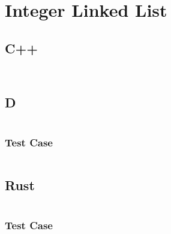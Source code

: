 \documentclass[finalcopy]{srpaper}
\begin{document}
\section{Integer Linked List}
\subsection{C++}
\begin{mdframed}[linecolor=black]
\inputminted[fontsize=\scriptsize]{cpp}{../examples/int-linked-list/int_linked_list.hpp}
\end{mdframed}

\begin{mdframed}[linecolor=black]
\inputminted[fontsize=\scriptsize]{cpp}{../examples/int-linked-list/int_linked_list.cpp}
\end{mdframed}

\subsection{D}
\begin{mdframed}[linecolor=black]
\inputminted[fontsize=\scriptsize]{d}{../examples/int-linked-list/int_linked_list.d}
\end{mdframed}

\subsubsection{Test Case}
\begin{mdframed}[linecolor=black]
\inputminted[fontsize=\scriptsize]{d}{../examples/int-linked-list/tests/int-linked-list-test.d}
\end{mdframed}

\subsection{Rust}
\begin{mdframed}[linecolor=black]
\inputminted[fontsize=\scriptsize]{rust}{../examples/int-linked-list/int_linked_list.rs}
\end{mdframed}

\subsubsection{Test Case}
\begin{mdframed}[linecolor=black]
\inputminted[fontsize=\scriptsize]{rust}{../examples/int-linked-list/tests/int-linked-list-test.rs}
\end{mdframed}
\end{document}
